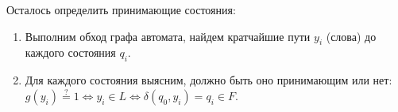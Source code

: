 \documentclass[a4paper]{article}
\newcommand{\peq}{\mathrel{+}=}
\newcommand{\meq}{\mathrel{-}=}
\newcommand{\deq}{\mathrel{:}=}
\begin{document}
Осталось определить принимающие состояния:
\begin{enumerate}[1.]
\item Выполним обход графа автомата, найдем кратчайшие пути $y_i$ (слова) до каждого состояния $q_i$.
\item Для каждого состояния выясним, должно быть оно принимающим или нет: $g(y_i)\overset{?}{=}1\Leftrightarrow y_i\in L\Leftrightarrow \delta(q_0,y_i)=q_i\in F$.
\end{enumerate}
\end{document}
